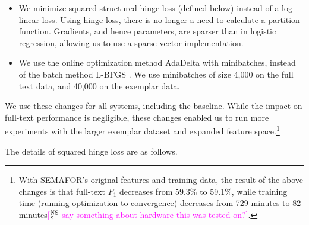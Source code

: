 \documentclass[11pt,a4paper]{article}
\DeclareMathOperator*{\argmax}{arg\,max}
\newcommand{\ensuretext}[1]{#1}
\newcommand{\nssmarker}{\ensuretext{\textcolor{magenta}{\ensuremath{^{\textsc{NS}}_{\textsc{S}}}}}}
\newcommand{\mkmarker}{\ensuretext{\textcolor{mdgreen}{\ensuremath{^{\textsc{M}}_{\textsc{K}}}}}}
\newcommand{\stmarker}{\ensuretext{\textcolor{blue}{\ensuremath{^{\textsc{S}}_{\textsc{T}}}}}}
\newcommand{\arkcomment}[3]{\ensuretext{\textcolor{#3}{[#1 #2]}}}
\newcommand{\nss}[1]{\arkcomment{\nssmarker}{#1}{magenta}}
\newcommand{\mk}[1]{\arkcomment{\mkmarker}{#1}{mdgreen}}
\newcommand{\st}[1]{\arkcomment{\stmarker}{#1}{blue}}
\begin{document}
\begin{itemize}
  \item We minimize squared structured hinge loss (defined below) instead of a log-linear loss.
  Using hinge loss, there is no longer a need to calculate a partition function.
  Gradients, and hence parameters, are sparser than in logistic regression, allowing us to use a sparse vector implementation.
  \item We use the online optimization method AdaDelta \citep{zeiler-12} with minibatches, instead of the batch method L-BFGS \citep{liu-89}.
  We use minibatches of size 4,000  on the full text data, and 40,000 on the exemplar data.
\end{itemize}
We use these changes for all systems, including the baseline.
While the impact on full-text performance is negligible, 
these changes enabled us to run more experiments with the larger exemplar dataset and expanded feature space.\footnote{With SEMAFOR's original features and training data, 
the result of the above changes is that full-text $F_1$ decreases from 59.3\% to 59.1\%, 
while training time (running optimization to convergence) 
decreases from 729 minutes to 82 minutes\nss{say something about hardware this was tested on?}.%
} 

% 

The details of squared hinge loss are as follows.
\end{document}
